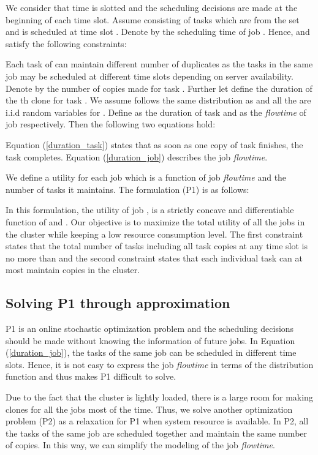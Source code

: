 \documentclass[10pt,conference]{IEEEtran}
\begin{document}
We consider that time is slotted and the scheduling decisions are made at the beginning of  each time slot. Assume  consisting of  tasks which are from the set  and  is scheduled at time slot . Denote by  the scheduling time of job . Hence,  and  satisfy the following constraints:


Each task of  can maintain different number of duplicates as the tasks in the same job may be scheduled at different time slots depending on server availability. Denote by  the number of copies made for task . Further let  define the duration of the th clone for task . We assume  follows the same distribution as  and  all the   are i.i.d random variables for .  Define  as the duration of task  and  as the \textit{flowtime} of job  respectively.  Then the following two equations hold:


Equation (\ref{duration_task}) states that as soon as one copy of task  finishes, the task completes. Equation (\ref{duration_job}) describes the job \textit{flowtime}.

We define a utility for each job which is a function of job \textit{flowtime} and the number of tasks it maintains. The formulation (P1) is as follows:


In this formulation, the utility of job ,  is a strictly concave  and differentiable function of   and . Our objective is to maximize the total utility of all the jobs in the cluster while keeping a low resource consumption level. The first constraint states that the total number of  tasks including all task copies at any time slot is no more than  and the second constraint states that each individual task can at most maintain  copies in the cluster.

\subsection{Solving P1 through approximation}
\label{p1_solve}
P1 is an online stochastic optimization problem and the scheduling decisions should be made without knowing the information of future jobs. In Equation (\ref{duration_job}), the tasks of the same job can be scheduled in different time slots. Hence, it is not easy to express the job \textit{flowtime} in terms of the distribution function and thus makes P1 difficult to solve.

Due to the fact that the cluster is lightly loaded, there is a large room for making clones for all the jobs most of the time. Thus, we solve another optimization problem (P2) as a relaxation for P1 when system resource is available. In P2, all the tasks of the same job are scheduled together and maintain the same number of copies. In this way, we can simplify the modeling of the job \textit{flowtime}.
\end{document}
